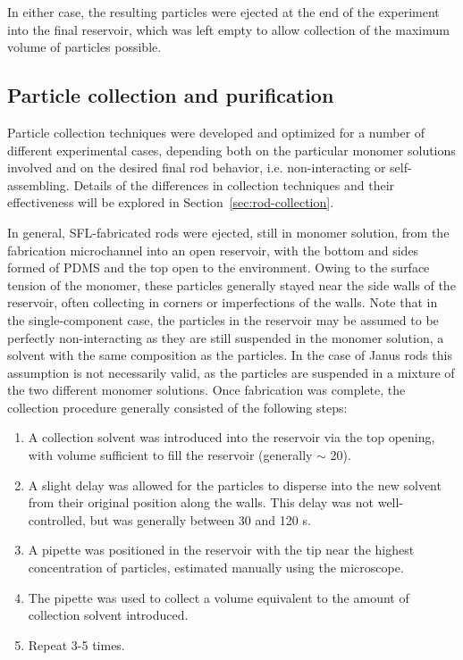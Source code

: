In either case, the resulting particles were ejected at the end of the experiment into the final reservoir, which
was left empty to allow collection of the maximum volume of particles possible.

\subsection{Particle collection and purification}
\label{sec:exp-collection}

Particle collection techniques were developed and optimized for a number of different experimental cases,
depending both on the particular monomer solutions involved and on the desired final rod behavior, i.e. 
non-interacting or self-assembling.  Details of the differences
in collection techniques and their effectiveness will be explored in Section~\ref{sec:rod-collection}.

In general, SFL-fabricated rods were ejected, still in monomer solution, from the fabrication microchannel into 
an open reservoir, with the bottom and sides formed of PDMS and the top open to the environment.  Owing to the
surface tension of the monomer, these particles generally stayed near the side walls of the reservoir, often
collecting in corners or imperfections of the walls.  Note that in the single-component case, the particles in
the reservoir may be assumed to be perfectly non-interacting as they are still suspended in the monomer solution, 
a solvent with the
same composition as the particles.   In the case of Janus rods this assumption is not necessarily valid, as
the particles are suspended in a mixture of the two different monomer solutions.  Once fabrication 
was complete, the collection procedure generally consisted of the following steps:

\begin{enumerate}
\item A collection solvent was introduced into the reservoir via the top opening, with volume sufficient to
fill the reservoir (generally $\sim$ 20\uL).
\item A slight delay was allowed for the particles to disperse into the new solvent from their 
original position along the 
walls. This delay was not well-controlled, but was generally between 30 and 120 s.
\item A pipette was positioned in the reservoir with the tip near the highest concentration of particles, estimated
manually using the microscope.
\item The pipette was used to collect a volume equivalent to the amount of collection solvent introduced.
\item Repeat 3-5 times.
\end{enumerate}

